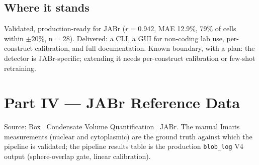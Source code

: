 \documentclass[11pt]{article}
\newcommand{\code}[1]{\texttt{\small #1}}
\begin{document}
\subsection{Where it stands}
Validated, production-ready for JABr ($r = 0.942$, MAE 12.9\%, 79\% of cells within
$\pm 20\%$, n = 28). Delivered: a CLI, a GUI for non-coding lab use, per-construct
calibration, and full documentation. Known boundary, with a plan: the detector is
JABr-specific; extending it needs per-construct calibration or few-shot retraining.
\newpage

\section{Part IV --- JABr Reference Data}
Source: Box \textrightarrow\ Condensate Volume Quantification \textrightarrow\ JABr. The
manual Imaris measurements (nuclear and cytoplasmic) are the ground truth against which the
pipeline is validated; the pipeline results table is the production \code{blob\_log} V4 output
(sphere-overlap gate, linear calibration).
\end{document}
